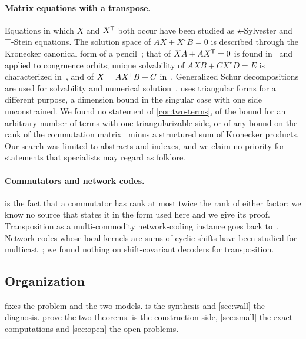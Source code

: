 \paragraph{Matrix equations with a transpose.} Equations in which $X$ and $X^{\mathsf{T}}$ both occur have been studied
as $\star$-Sylvester and $\top$-Stein equations. The solution space of $AX+X^{\star}B=0$ is described through the
Kronecker canonical form of a pencil~\cite{DeTeranDopicoGuilleryMontealegreReyes2013}; that of $XA+AX^{\mathsf{T}}=0$ is
found in~\cite{DeTeranDopico2011} and applied to congruence orbits; unique solvability of $AXB+CX^{\star}D=E$ is
characterized in~\cite{DeTeranIannazzoPoloniRobol2018}, and of $X=AX^{\mathsf{T}}B+C$ in~\cite{Chiang2013}. Generalized Schur
decompositions are used for solvability and numerical solution~\cite{ChiangChuLin2012}.  uses
triangular forms for a different purpose, a dimension bound in the singular case with one side unconstrained. We found no statement of \cref{cor:two-terms}, of the
bound for an arbitrary number of terms with one triangularizable side, or of any bound on the rank of the commutation
matrix~\cite{MagnusNeudecker1979} minus a structured sum of Kronecker products. Our search was limited to abstracts and
indexes, and we claim no priority for statements that specialists may regard as folklore.

\paragraph{Commutators and network codes.}  is the fact that a commutator has rank at most twice
the rank of either factor; we know no source that states it in the form used here and we give its proof. Transposition
as a multi-commodity network-coding instance goes back to~\cite{AHJKL2006}. Network codes whose local kernels are sums
of cyclic shifts have been studied for multicast~\cite{TangSunLiYangLong2019}; we found nothing on shift-covariant
decoders for transposition.

\subsection{Organization}

 fixes the problem and the two models.  is the synthesis and \cref{sec:wall} the
diagnosis.  prove the two theorems.  is the construction side,
\cref{sec:small} the exact computations and \cref{sec:open} the open problems.
